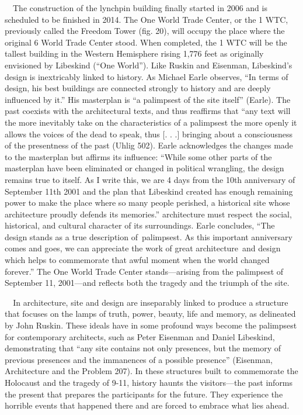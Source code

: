 {\color{black}
\ \ The construction of the lynchpin building finally started in 2006
and is scheduled to be finished in 2014.  The One World Trade Center,
or the 1 WTC, previously called the Freedom Tower (fig. 20), will
occupy the place where the original 6 World Trade Center stood.  When
completed, the 1 WTC will be the tallest building in the Western
Hemisphere rising 1,776 feet as originally envisioned by Libeskind
(“One World”).  Like Ruskin and Eisenman, Libeskind’s design is
inextricably linked to history.  As Michael Earle observes, “In terms
of design, his best buildings are connected strongly to history and are
deeply influenced by it.”  His masterplan is “a palimpsest of the site
itself” (Earle).  The past coexists with the architectural texts, and
thus reaffirms that “any text will the more inevitably take on the
characteristics of a palimpsest the more openly it allows the voices of
the dead to speak, thus [. . .] bringing about a consciousness of the
presentness of the past{\textquotedbl} (Uhlig 502).  Earle acknowledges
the changes made to the masterplan but affirms its influence:
“\textcolor[rgb]{0.26666668,0.26666668,0.26666668}{While some other
parts of the masterplan have been eliminated or changed in political
wrangling, the design remains true to itself.  As I write this, we are
4 days from the 10th anniversary of September 11th 2001 and the plan
that Libeskind created has enough remaining power to make the place
where so many people perished, a historical site whose architecture
proudly defends its memories.” 
}\textstyleappleconvertedspace{\textcolor[rgb]{0.26666668,0.26666668,0.26666668}{~As
demonstrated through his symbolism, the design has been connected to
memory, one of the seven laws of architecture delineated by Ruskin, as
he affirms that }}architecture must respect the social, historical, and
cultural character of its surroundings.  Earle concludes, “The design
stands as a true description of~palimpsest.  As this important
anniversary comes and goes, we can appreciate the work of great
architecture~and design which helps to commemorate that awful moment
when the world changed forever.”  The One World Trade Center
stands—arising from the palimpsest of September 11, 2001—and reflects
both the tragedy and the triumph of the site.}

{\color{black}
\textit{\ \ }In architecture, site and design are inseparably linked to
produce a structure that focuses on the lamps of truth, power, beauty,
life and memory, as delineated by John Ruskin.  These ideals have in
some profound ways become the palimpsest for contemporary architects,
such as Peter Eisenman and Daniel Libeskind, demonstrating that “any
site contains not only presences, but the memory of previous presences
and the immanences of a possible presence” (Eisenman,
{\textquotedbl}Architecture and the Problem{\textquotedbl} 207).  In
these structures built to commemorate the Holocaust and the tragedy of
9-11, history haunts the visitors—the past informs the present that
prepares the participants for the future.  They experience the horrible
events that happened there and are forced to embrace what lies ahead. 
}


